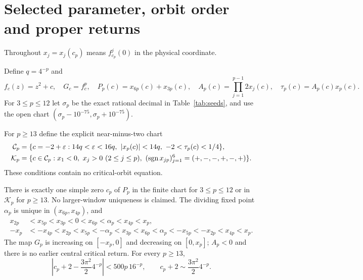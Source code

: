 \section{Selected parameter, orbit order and proper returns}\label{sec:parameter}
Throughout $x_j=x_j(c_p)$ means $f_{c_p}^j(0)$ in the physical coordinate.

Define $q=4^{-p}$ and
\begin{equation}\label{eq:basic}
 f_c(z)=z^2+c,\quad G_c=f_c^p,\quad
 P_p(c)=x_{6p}(c)+x_{3p}(c),\quad
 A_p(c)=\prod_{j=1}^{p-1}2x_j(c),\quad
 \tau_p(c)=A_p(c)x_p(c).
\end{equation}
For $3\le p\le12$ let $\sigma_p$ be the exact rational decimal in Table~\ref{tab:seeds}, and use the open chart
$(\sigma_p-10^{-75},\sigma_p+10^{-75})$.

For $p\ge13$ define the explicit near-minus-two chart
\begin{align}
 \mathcal{C}_p&=\{c=-2+\eps:14q<\eps<16q,\ 
 |x_p(c)|<14q,\ -2<\tau_p(c)<1/4\},\label{eq:chart}\\
 \mathcal{K}_p&=\{c\in\mathcal{C}_p:x_1<0,\ x_j>0\ (2\le j\le p),\
 (\operatorname{sgn}x_{jp})_{j=1}^6=(+,-,-,+,-,+)\}.\label{eq:knead}
\end{align}
These conditions contain no critical-orbit equation.
\begin{theorem}\label{thm:real}
There is exactly one simple zero $c_p$ of $P_p$ in the finite chart for $3\le p\le12$ or in $\mathcal K_p$ for $p\ge13$.  No larger-window uniqueness is claimed.  The dividing fixed point $\alpha_p$ is unique in $(x_{6p},x_{4p})$, and
\begin{align}
 x_{2p}&<x_{5p}<x_{3p}<0<x_{6p}<\alpha_p<x_{4p}<x_p,\label{eq:order1}\\
 -x_p&<-x_{4p}<x_{2p}<x_{5p}<-\alpha_p<x_{3p}<x_{6p}
 <\alpha_p<-x_{5p}<-x_{2p}<x_{4p}<x_p.\label{eq:order2}
\end{align}
The map $G_p$ is increasing on $[-x_p,0]$ and decreasing on $[0,x_p]$; $A_p<0$ and there is no earlier central critical return.  For every $p\ge13$,
\begin{equation}\label{eq:tip-rate}
 \left|c_p+2-\frac{3\pi^2}{2}4^{-p}\right|
 <500p\,16^{-p},
 \qquad c_p+2\sim\frac{3\pi^2}{2}4^{-p}.
\end{equation}
\end{theorem}

